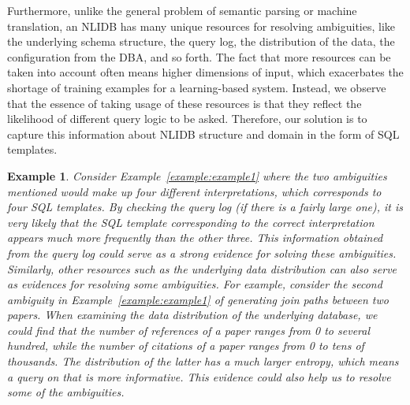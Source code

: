 \documentclass{vldb}
\newtheorem{example}{Example}
\begin{document}
Furthermore, unlike the general problem of semantic parsing or machine translation, an NLIDB has many unique resources for resolving ambiguities, like the underlying schema structure, the query log, the distribution of the data, the configuration from the DBA, and so forth.
The fact that more resources can be taken into account often means higher dimensions of input, which exacerbates the shortage of training examples for a learning-based system.  Instead, we observe that the essence of taking usage of these resources is that they reflect the likelihood of different query logic to be asked.  Therefore, our solution is to capture this information about NLIDB structure and domain in the form of SQL templates.
\begin{example}
Consider Example~\ref{example:example1} where the two ambiguities mentioned would make up four different interpretations, which corresponds to four SQL templates.  By checking the query log (if there is a fairly large one), it is very likely that the SQL template corresponding to the correct interpretation appears much more frequently than the other three.  This information obtained from the query log could serve as a strong evidence for solving these ambiguities.  Similarly, other resources such as the underlying data distribution can also serve as evidences for resolving some ambiguities.  For example, consider the second ambiguity in Example~\ref{example:example1} of generating join paths between two papers.  When examining the data distribution of the underlying database, we could find that the number of references of a paper ranges from 0 to several hundred, while the number of citations of a paper ranges from 0 to tens of thousands.  The distribution of the latter has a much larger entropy, which means a query on that is more informative.  This evidence could also help us to resolve some of the ambiguities.
\end{example}

\end{document}
